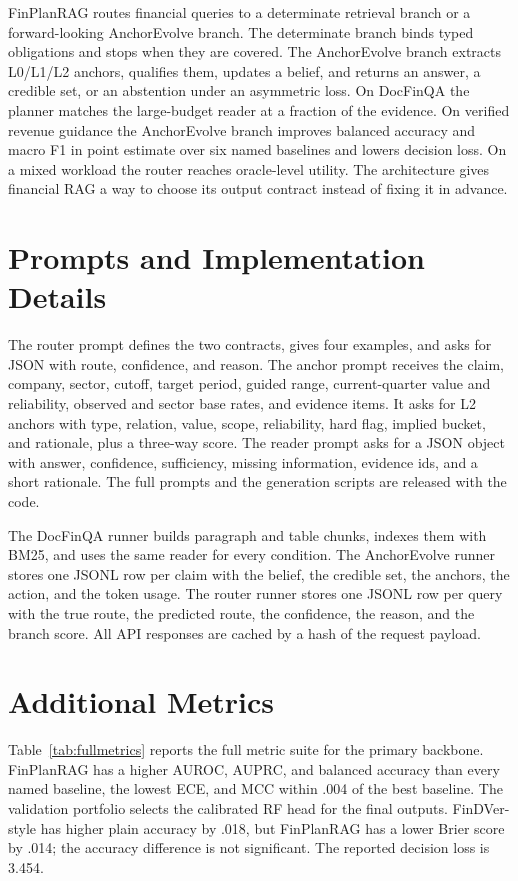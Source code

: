 \documentclass[11pt]{article}
\newcommand{\method}{FinPlanRAG}
\begin{document}
\method{} routes financial queries to a determinate retrieval branch or a forward-looking AnchorEvolve branch. The determinate branch binds typed obligations and stops when they are covered. The AnchorEvolve branch extracts L0/L1/L2 anchors, qualifies them, updates a belief, and returns an answer, a credible set, or an abstention under an asymmetric loss. On DocFinQA the planner matches the large-budget reader at a fraction of the evidence. On verified revenue guidance the AnchorEvolve branch improves balanced accuracy and macro F1 in point estimate over six named baselines and lowers decision loss. On a mixed workload the router reaches oracle-level utility. The architecture gives financial RAG a way to choose its output contract instead of fixing it in advance.



\appendix

\section{Prompts and Implementation Details}
The router prompt defines the two contracts, gives four examples, and asks for JSON with route, confidence, and reason. The anchor prompt receives the claim, company, sector, cutoff, target period, guided range, current-quarter value and reliability, observed and sector base rates, and evidence items. It asks for L2 anchors with type, relation, value, scope, reliability, hard flag, implied bucket, and rationale, plus a three-way score. The reader prompt asks for a JSON object with answer, confidence, sufficiency, missing information, evidence ids, and a short rationale. The full prompts and the generation scripts are released with the code.

The DocFinQA runner builds paragraph and table chunks, indexes them with BM25, and uses the same reader for every condition. The AnchorEvolve runner stores one JSONL row per claim with the belief, the credible set, the anchors, the action, and the token usage. The router runner stores one JSONL row per query with the true route, the predicted route, the confidence, the reason, and the branch score. All API responses are cached by a hash of the request payload.

\section{Additional Metrics}
Table~\ref{tab:fullmetrics} reports the full metric suite for the primary backbone. \method{} has a higher AUROC, AUPRC, and balanced accuracy than every named baseline, the lowest ECE, and MCC within .004 of the best baseline. The validation portfolio selects the calibrated RF head for the final outputs. FinDVer-style has higher plain accuracy by .018, but \method{} has a lower Brier score by .014; the accuracy difference is not significant. The reported decision loss is 3.454.
\end{document}
